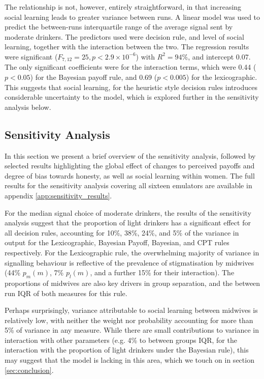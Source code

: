 The relationship is not, however, entirely straightforward, in that increasing social learning leads to greater variance between runs. A linear model was used to predict the between-runs interquartile range of the average signal sent by moderate drinkers. The predictors used were decision rule, and level of social learning, together with the interaction between the two. The regression results were significant (\(F_{7,12}=25,p<2.9\times10^{-6}\)) with \(R^2=94\%\), and intercept 0.07. The only significant coefficients were for the interaction terms, which were 0.44 (\(p<0.05\)) for the Bayesian payoff rule, and 0.69 (\(p<0.005\)) for the lexicographic. This suggests that social learning, for the heuristic style decision rules introduces considerable uncertainty to the model, which is explored further in the sensitivity analysis below.


\subsection{Sensitivity Analysis}
\label{sub:sa_results}

In this section we present a brief overview of the sensitivity analysis, followed by selected results highlighting the global effect of changes to perceived payoffs and degree of bias towards honesty, as well as social learning within women. The full results for the sensitivity analysis covering all sixteen emulators are available in appendix \ref{app:sensitivity_results}.

For the median signal choice of moderate drinkers, the results of the sensitivity analysis suggest that the proportion of light drinkers has a significant effect for all decision rules, accounting for 10\%, 38\%, 24\%, and 5\% of the variance in output for the Lexicographic, Bayesian Payoff, Bayesian, and \ac{CPT} rules respectively. For the Lexicographic rule, the overwhelming majority of variance in signalling behaviour is reflective of the prevalence of stigmatisation by midwives (44\% \(p_{m}(m)\), 7\% \(p_{l}(m)\), and a further 15\% for their interaction).  The proportions of midwives are also key drivers in group separation, and the between run IQR of both measures for this rule. 

Perhaps surprisingly, variance attributable to social learning between midwives is relatively low, with neither the weight nor probability accounting for more than 5\% of variance in any measure. While there are small contributions to variance in interaction with other parameters (e.g. 4\% to between groups IQR, for the interaction with the proportion of light drinkers under the Bayesian rule), this may suggest that the model is lacking in this area, which we touch on in section \ref{sec:conclusion}.

